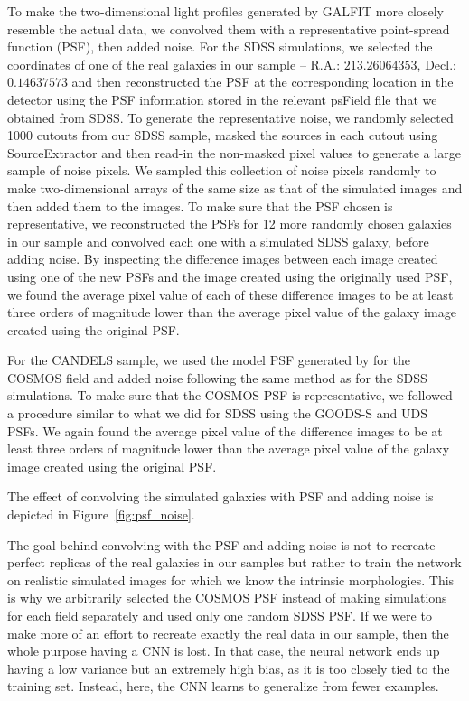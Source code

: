 To make the two-dimensional light profiles generated by GALFIT more closely resemble the actual data, we convolved them with a representative point-spread function (PSF), then added noise. For the SDSS simulations, we selected the coordinates of one of the real galaxies in our sample -- R.A.: $213.26064353$, Decl.: $0.14637573$ and then reconstructed the PSF at the corresponding location in the detector using the PSF information stored in the relevant psField file that we obtained from SDSS. To generate the representative noise, we randomly selected 1000 cutouts from our SDSS sample, masked the sources in each cutout using SourceExtractor \citep{s_extract} and then read-in the non-masked pixel values to generate a large sample of noise pixels. We sampled this collection of noise pixels randomly to make two-dimensional arrays of the same size as that of the simulated images and then added them to the images. To make sure that the PSF chosen is representative, we reconstructed the PSFs for 12 more randomly chosen galaxies in our sample and convolved each one with a simulated SDSS galaxy, before adding noise. By inspecting the difference images between each image created using one of the new PSFs and the image created using the originally used PSF, we found the average pixel value of each of these difference images to be at least three orders of magnitude lower than the average pixel value of the galaxy image created using the original PSF.


For the CANDELS sample, we used the model PSF generated by \citet{vdw_12} for the COSMOS field and added noise following the same method as for the SDSS simulations. To make sure that the COSMOS PSF is representative, we followed a procedure similar to what we did for SDSS using the GOODS-S and UDS PSFs. We again found the average pixel value of the difference images to be at least three orders of magnitude lower than the average pixel value of the galaxy image created using the original PSF. 

The effect of convolving the simulated galaxies with PSF and adding noise is depicted in Figure~\ref{fig:psf_noise}.

The goal behind convolving with the PSF and adding noise is not to recreate perfect replicas of the real galaxies in our samples but rather to train the network on realistic simulated images for which we know the intrinsic morphologies. This is why we arbitrarily selected the COSMOS PSF instead of making simulations for each field separately and used only one random SDSS PSF. If we were to make more of an effort to recreate exactly the real data in our sample, then the whole purpose having a CNN is lost. In that case, the neural network ends up having a low variance but an extremely high bias, as it is too closely tied to the training set. Instead, here, the CNN learns to generalize from fewer examples.  

